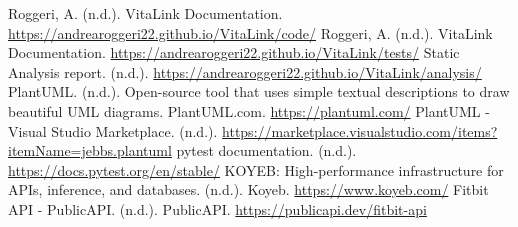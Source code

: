 \documentclass[12pt,a4paper,oneside]{report}
\begin{document}
\begin{thebibliography}{99}
     Roggeri, A. (n.d.). VitaLink Documentation. \url{https://andrearoggeri22.github.io/VitaLink/code/}
     Roggeri, A. (n.d.). VitaLink Documentation. \url{https://andrearoggeri22.github.io/VitaLink/tests/}
     Static Analysis report. (n.d.). \url{https://andrearoggeri22.github.io/VitaLink/analysis/}
     PlantUML. (n.d.). Open-source tool that uses simple textual descriptions to draw beautiful UML diagrams. PlantUML.com. \url{https://plantuml.com/}
     PlantUML - Visual Studio Marketplace. (n.d.). \url{https://marketplace.visualstudio.com/items?itemName=jebbs.plantuml}
     pytest documentation. (n.d.). \url{https://docs.pytest.org/en/stable/}
     KOYEB: High-performance infrastructure for APIs, inference, and databases. (n.d.). Koyeb. \url{https://www.koyeb.com/}
     Fitbit API - PublicAPI. (n.d.). PublicAPI. \url{https://publicapi.dev/fitbit-api}
  \end{thebibliography}
\end{document}
